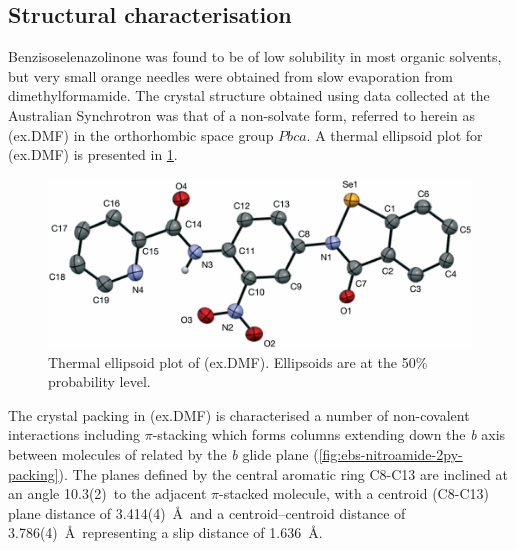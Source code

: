 \begin{refsection}
\subsection{Structural characterisation}
Benzisoselenazolinone  was found to be of low solubility in most organic solvents, but very small orange needles were obtained from slow evaporation from dimethylformamide.
The crystal structure obtained using data collected at the Australian Synchrotron was that of a non-solvate form, referred to herein as (ex.DMF) in the orthorhombic space group $ Pbca $.
A thermal ellipsoid plot for (ex.DMF) is presented in \cref{fig:ebs-nitroamide-2py-dmf-xtal}.

\begin{figure}
    \centering
    \includegraphics[width=0.8\linewidth]{Figures/ebs-nitroamide-2py-dmf-xtal.pdf}
    \caption[Thermal ellipsoid plot of (ex.DMF).]{Thermal ellipsoid plot of (ex.DMF). Ellipsoids are at the 50\% probability level.}\label{fig:ebs-nitroamide-2py-dmf-xtal}
\end{figure}

The crystal packing in (ex.DMF) is characterised a number of non-covalent interactions including $\pi$-stacking which forms columns extending down the \emph{b} axis between molecules of  related by the \emph{b} glide plane (\cref{fig:ebs-nitroamide-2py-packing}).
The planes defined by the central aromatic ring C8-C13 are inclined at an angle 10.3(2)\degree~to the adjacent $\pi$-stacked molecule, with a centroid (C8-C13) plane distance of 3.414(4)~\AA~and a centroid–centroid distance of 3.786(4)~\AA~representing a slip distance of 1.636~\AA.\@


\end{refsection}
